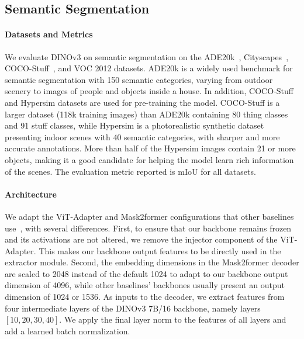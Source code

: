 \subsection{Semantic Segmentation}
\label{app:exp-details:segmentation-system}

\paragraph{Datasets and Metrics}
We evaluate DINOv3 on semantic segmentation on the ADE20k~\citep{zhou2017scene}, Cityscapes~\citep{cordts2016cityscapes}, COCO-Stuff~\citep{caesar2018coco}, and VOC 2012 \citep{pascal-voc-2012} datasets. 
ADE20k is a widely used benchmark for semantic segmentation with 150 semantic categories, varying from outdoor scenery to images of people and objects inside a house. 
In addition, COCO-Stuff and Hypersim \citep{roberts2021hypersim} datasets are used for pre-training the model.
COCO-Stuff is a larger dataset (118k training images) than ADE20k containing 80 thing classes and 91 stuff classes, while Hypersim is a photorealistic synthetic dataset presenting indoor scenes with 40 semantic categories, with sharper and more accurate annotations. 
More than half of the Hypersim images contain 21 or more objects, making it a good candidate for helping the model learn rich information of the scenes. 
The evaluation metric reported is mIoU for all datasets.

\paragraph{Architecture}
We adapt the ViT-Adapter and Mask2former configurations that other baselines use~\citep{wang2023onepeace}, with several differences.
First, to ensure that our backbone remains frozen and its activations are not altered, we remove the injector component of the ViT-Adapter. 
This makes our backbone output features to be directly used in the extractor module. 
Second, the embedding dimensions in the Mask2former decoder are scaled to 2048 instead of the default 1024 to adapt to our backbone output dimension of 4096, while other baselines' backbones usually present an output dimension of 1024 or 1536.
As inputs to the decoder, we extract features from four intermediate layers of the DINOv3 7B/16 backbone, namely layers \([10, 20, 30, 40]\).
We apply the final layer norm to the features of all layers and add a learned batch normalization.

